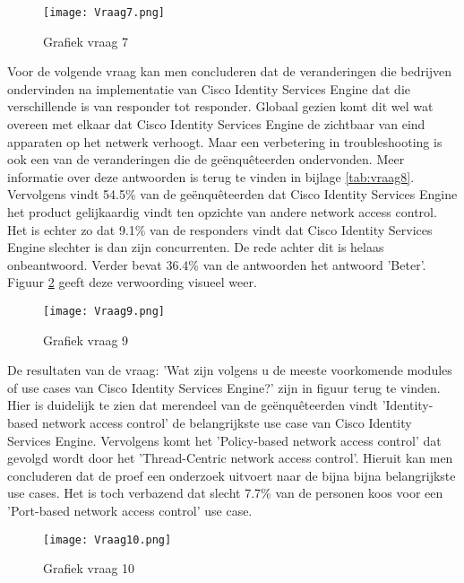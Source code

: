 \begin{figure}[H]
	\centering
	\texttt{[image: Vraag7.png]}
	\caption{Grafiek vraag 7}
	\label{fig:vraag7}
\end{figure}

Voor de volgende vraag kan men concluderen dat de veranderingen die bedrijven ondervinden na implementatie van Cisco Identity Services Engine dat die verschillende is van responder tot responder. Globaal gezien komt dit wel wat overeen met elkaar dat Cisco Identity Services Engine de zichtbaar van eind apparaten op het netwerk verhoogt. Maar een verbetering in troubleshooting is ook een van de veranderingen die de geënquêteerden ondervonden. Meer informatie over deze antwoorden is terug te vinden in bijlage \ref{tab:vraag8}. Vervolgens vindt 54.5\% van de geënquêteerden dat Cisco Identity Services Engine het product gelijkaardig vindt ten opzichte van andere network access control. Het is echter zo dat 9.1\% van de responders vindt dat Cisco Identity Services Engine slechter is dan zijn concurrenten. De rede achter dit is helaas onbeantwoord. Verder bevat 36.4\% van de antwoorden het antwoord 'Beter'. Figuur \ref{fig:vraag9} geeft deze verwoording visueel weer. 

\begin{figure}[H]
	\centering
	\texttt{[image: Vraag9.png]}
	\caption{Grafiek vraag 9}
	\label{fig:vraag9}
\end{figure}

De resultaten van de vraag: 'Wat zijn volgens u de meeste voorkomende modules of use cases van Cisco Identity Services Engine?' zijn in figuur \label{fig:vraag10} terug te vinden. Hier is duidelijk te zien dat merendeel van de geënquêteerden vindt 'Identity-based network access control' de belangrijkste use case van Cisco Identity Services Engine. Vervolgens komt het 'Policy-based network access control' dat gevolgd wordt door het 'Thread-Centric network access control'. Hieruit kan men concluderen dat de proef een onderzoek uitvoert naar de bijna bijna belangrijkste use cases. Het is toch verbazend dat slecht 7.7\% van de personen koos voor een 'Port-based network access control' use case. 

\begin{figure}[H]
	\centering
	\texttt{[image: Vraag10.png]}
	\caption{Grafiek vraag 10}
\end{figure}

